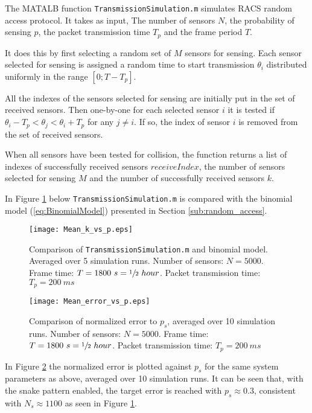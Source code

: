 \documentclass[Main]{subfiles}
\begin{document}
		The MATALB function \texttt{TransmissionSimulation.m} simulates RACS random access protocol.
		It takes as input, The number of sensors $N$, the probability of sensing $p$, the packet transmission time $T_p$ and the frame period $T$.

		It does this by first selecting a random set of $M$ sensors for sensing.
		Each sensor selected for sensing is assigned a random time to start transmission $\theta_i$ distributed uniformly in the range $[0 ; T - T_p]$.

		All the indexes of the sensors selected for sensing are initially put in the set of received sensors.
		Then one-by-one for each selected sensor $i$ it is tested if 
		$\theta_i - T_p < \theta_j < \theta_i + T_p$
		for any
		$j \neq i$.
		If so, the index of sensor $i$ is removed from the set of received sensors.

		When all sensors have been tested for collision, the function returns a list of indexes of successfully received sensors $receiveIndex$, the number of sensors selected for sensing $M$ and the number of successfully received sensors $k$.

		In Figure \ref{fig:Mean_k_vs_p} below \texttt{TransmissionSimulation.m} is compared with the binomial model (\ref{eq:BinomialModel}) presented in Section \ref{sub:random_access}.

		\begin{figure}[H]
			\centering 
			\texttt{[image: Mean\_k\_vs\_p.eps]}
			\caption{Comparison of \texttt{TransmissionSimulation.m} and binomial model. Averaged over 5 simulation runs.
			Number of sensors: $N = 5000$.
			Frame time: $T = 1800\ s = \sfrac{1}{2}\ hour$.
			Packet transmission time: $T_p = 200\ ms$}
			\label{fig:Mean_k_vs_p}
		\end{figure}

		\begin{figure}[H]
			\centering 
			\texttt{[image: Mean\_error\_vs\_p.eps]}
			\caption{Comparison of normalized error to $p_s$, averaged over 10 simulation runs.
			Number of sensors: $N = 5000$.
			Frame time: $T = 1800\ s = \sfrac{1}{2}\ hour$.
			Packet transmission time: $T_p = 200\ ms$}
			\label{fig:Mean_error_vs_p}
		\end{figure}
	
		In Figure \ref{fig:Mean_error_vs_p} the normalized error is plotted against $p_s$ for the same system parameters as above, averaged over 10 simulation runs.
		It can be seen that, with the snake pattern enabled, the target error is reached with $p_s \approx 0.3$, consistent with $N_s \approx 1100$ as seen in Figure \ref{fig:Mean_k_vs_p}.
\end{document}
